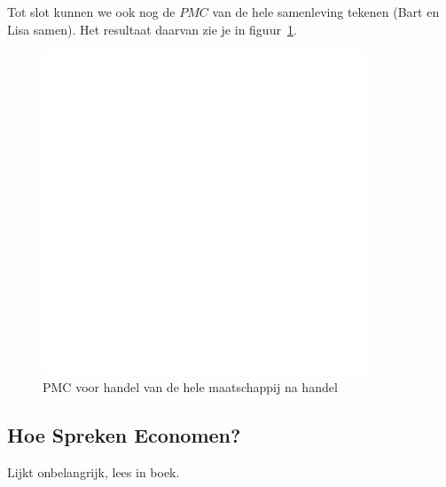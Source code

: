 Tot slot kunnen we ook nog de $PMC$ van de hele samenleving tekenen (Bart en Lisa samen). Het resultaat daarvan zie je in figuur~\ref{fig:pmcHandel}.
\begin{figure}[htbp]
	\centering
	\includegraphics[scale=0.4]{Images/white.png}
	\caption{PMC voor handel van de hele maatschappij na handel}
	\label{fig:pmcHandel}
\end{figure}


\subsection{Hoe Spreken Economen?}
Lijkt onbelangrijk, lees in boek.
